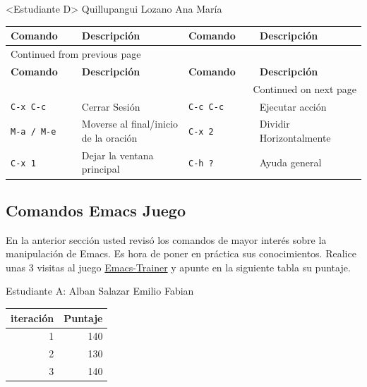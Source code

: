 \documentclass{article}
\begin{document}
<Estudiante D> Quillupangui Lozano Ana María
\begin{longtable}{|p{0.2\linewidth}|p{0.3\linewidth}|p{0.2\linewidth}|p{0.3\linewidth}|}
\textbf{Comando} & \textbf{Descripción} & \textbf{Comando} & \textbf{Descripción}\\[0pt]
\hline
\endfirsthead
\multicolumn{4}{l}{Continued from previous page} \\[0pt]
\hline

\textbf{Comando} & \textbf{Descripción} & \textbf{Comando} & \textbf{Descripción} \\[0pt]

\hline
\endhead
\hline\multicolumn{4}{r}{Continued on next page} \\
\endfoot
\endlastfoot
\hline
\texttt{C-x C-c} & Cerrar Sesión & \texttt{C-c C-c} & Ejecutar acción\\[0pt]
\texttt{M-a / M-e} & Moverse al final/inicio de la oración & \texttt{C-x 2} & Dividir Horizontalmente\\[0pt]
\texttt{C-x 1} & Dejar la ventana principal & \texttt{C-h ?} & Ayuda general\\[0pt]
\end{longtable}
\subsection{Comandos Emacs Juego}
\label{sec:org5733771}
En la anterior sección usted revisó los comandos de mayor interés
sobre la manipulación de Emacs. Es hora de poner en práctica sus
conocimientos. Realice unas 3 visitas al juego  \href{https://chat.qwen.ai/s/deploy/t\_23ff57ef-b59a-4bd7-9b79-54679b33686d}{Emacs-Trainer} y apunte
en la siguiente tabla su puntaje.

Estudiante A: Alban Salazar Emilio Fabian
\begin{center}
\begin{tabular}{rr}
\hline
iteración & Puntaje\\[0pt]
\hline
1 & 140\\[0pt]
2 & 130\\[0pt]
3 & 140\\[0pt]
\hline
\end{tabular}
\end{center}
\end{document}
